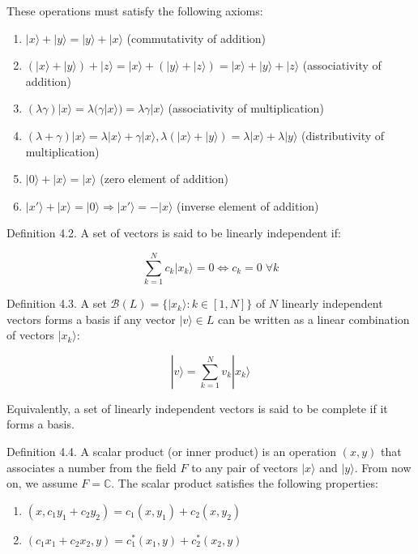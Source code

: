 \documentclass[italian]{HKNdocument}
\begin{document}
These operations must satisfy the following axioms:
\begin{enumerate}
  \item $|x\rangle+|y\rangle=|y\rangle+|x\rangle$ (commutativity of addition)
  \item $(|x\rangle+|y\rangle)+|z\rangle=|x\rangle+(|y\rangle+|z\rangle)=|x\rangle+|y\rangle+|z\rangle$ (associativity of addition)
  \item $(\lambda\gamma)|x\rangle=\lambda(\gamma|x\rangle)=\lambda\gamma|x\rangle$ (associativity of multiplication)
  \item $(\lambda+\gamma)|x\rangle=\lambda|x\rangle+\gamma|x\rangle, \lambda(|x\rangle+|y\rangle)=\lambda|x\rangle+\lambda|y\rangle$ (distributivity of multiplication)
  \item $|0\rangle+|x\rangle=|x\rangle$ (zero element of addition)
  \item $|x'\rangle+|x\rangle=|0\rangle \Longrightarrow |x'\rangle=-|x\rangle$ (inverse element of addition)
\end{enumerate}

Definition 4.2. A set of vectors is said to be linearly independent if:


\begin{equation}
\sum_{k=1}^{N} c_k|x_k\rangle = 0 \Longleftrightarrow c_k = 0 \;\forall k
\end{equation}

Definition 4.3. A set $\mathcal{B}(L) = \{|x_k\rangle: k \in [1,N]\}$ of $N$ linearly independent vectors forms a basis if any vector $|v\rangle \in L$ can be written as a linear combination of vectors $|x_k\rangle$:

\begin{equation}
|v\rangle = \sum_{k=1}^{N} v_k|x_k\rangle
\end{equation}

Equivalently, a set of linearly independent vectors is said to be complete if it forms a basis.

Definition 4.4. A scalar product (or inner product) is an operation $(x,y)$ that associates a number from the field $F$ to any pair of vectors $|x\rangle$ and $|y\rangle$. From now on, we assume $F = \mathbb{C}$. The scalar product satisfies the following properties:

\begin{enumerate}
  \item $(x, c_1y_1 + c_2y_2) = c_1(x,y_1) + c_2(x,y_2)$
  \item $(c_1x_1 + c_2x_2, y) = c_1^*(x_1,y) + c_2^*(x_2,y)$
\end{enumerate}
\end{document}
